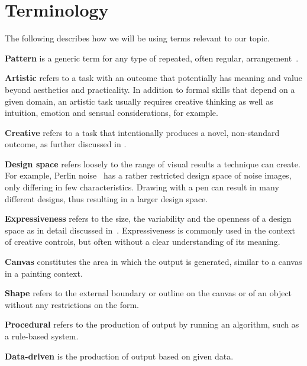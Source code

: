 
\section{Terminology}\label{terminology}
The following describes how we will be using terms relevant to our topic. 

\textbf{Pattern} is a generic term for any type of repeated, often regular, arrangement~\cite{oed_2017}.


\textbf{Artistic} refers to a task with an outcome that potentially has meaning and value beyond aesthetics and practicality. In addition to formal skills that depend on a given domain, an artistic task usually requires creative thinking as well as intuition, emotion and sensual considerations, for example.

\textbf{Creative} refers to a task that intentionally produces a novel, non-standard outcome, as further discussed in . 

\textbf{Design space} refers loosely to the range of visual results a technique can create. For example, Perlin noise~\cite{perlin_1985_ais} has a rather restricted design space of noise images, only differing in few characteristics. Drawing with a pen can result in many different designs, thus resulting in a larger design space.

\textbf{Expressiveness} refers to the size, the variability and the openness of a design space as in detail discussed in~. Expressiveness is commonly used in the context of creative controls, but often without a clear understanding of its meaning.

\textbf{Canvas} constitutes the area in which the output is generated, similar to a canvas in a painting context.

\textbf{Shape} refers to the external boundary or outline on the canvas or of an object without any restrictions on the form. 

\textbf{Procedural} refers to the production of output by running an algorithm, such as a rule-based system.

\textbf{Data-driven} is the production of output based on given data.



